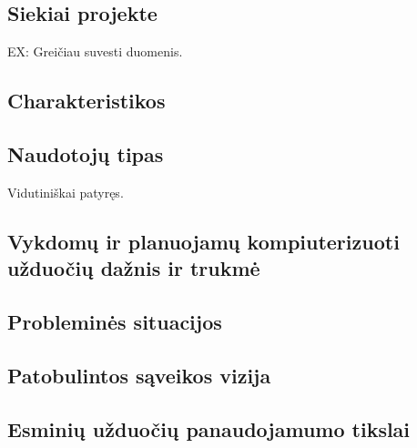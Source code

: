 \subsection{Siekiai projekte}
EX: Greičiau suvesti duomenis.

\subsection{Charakteristikos}
\xchars
{
}

\subsection{Naudotojų tipas}
Vidutiniškai patyręs.

\subsection{Vykdomų ir planuojamų kompiuterizuoti užduočių dažnis ir trukmė}


\subsection{Probleminės situacijos}
\subsection{Patobulintos sąveikos vizija}
\subsection{Esminių užduočių panaudojamumo tikslai}
